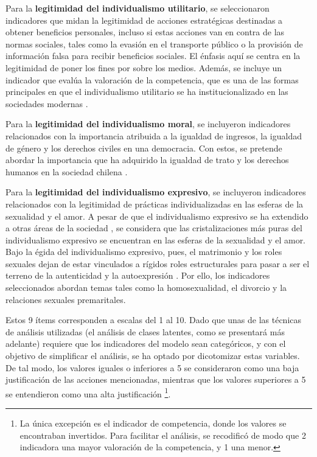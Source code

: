 \documentclass[12pt,twoside]{templates/facsothesis}
\begin{document}
Para la \textbf{legitimidad del individualismo utilitario}, se seleccionaron indicadores que midan la legitimidad de acciones estratégicas destinadas a obtener beneficios personales, incluso si estas acciones van en contra de las normas sociales, tales como la evasión en el transporte público o la provisión de información falsa para recibir beneficios sociales. El énfasis aquí se centra en la legitimidad de poner los fines por sobre los medios. Además, se incluye un indicador que evalúa la valoración de la competencia, que es una de las formas principales en que el individualismo utilitario se ha institucionalizado en las sociedades modernas \citep{cortois2018}.

Para la \textbf{legitimidad del individualismo moral}, se incluyeron indicadores relacionados con la importancia atribuida a la igualdad de ingresos, la igualdad de género y los derechos civiles en una democracia. Con estos, se pretende abordar la importancia que ha adquirido la igualdad de trato y los derechos humanos en la sociedad chilena \citep{araujo2012, araujo2020a}.

Para la \textbf{legitimidad del individualismo expresivo}, se incluyeron indicadores relacionados con la legitimidad de prácticas individualizadas en las esferas de la sexualidad y el amor. A pesar de que el individualismo expresivo se ha extendido a otras áreas de la sociedad \citep{gauthier2021}, se considera que las cristalizaciones más puras del individualismo expresivo se encuentran en las esferas de la sexualidad y el amor. Bajo la égida del individualismo expresivo, pues, el matrimonio y los roles sexuales dejan de estar vinculados a rígidos roles estructurales para pasar a ser el terreno de la autenticidad y la autoexpresión \citep{illouz2020}. Por ello, los indicadores seleccionados abordan temas tales como la homosexualidad, el divorcio y la relaciones sexuales premaritales.

Estos 9 ítems corresponden a escalas del 1 al 10. Dado que unas de las técnicas de análisis utilizadas (el análisis de clases latentes, como se presentará más adelante) requiere que los indicadores del modelo sean categóricos, y con el objetivo de simplificar el análisis, se ha optado por dicotomizar estas variables. De tal modo, los valores iguales o inferiores a 5 se consideraron como una baja justificación de las acciones mencionadas, mientras que los valores superiores a 5 se entendieron como una alta justificación \footnote{La única excepción es el indicador de competencia, donde los valores se encontraban invertidos. Para facilitar el análisis, se recodificó de modo que 2 indicadora una mayor valoración de la competencia, y 1 una menor.}.
\end{document}
